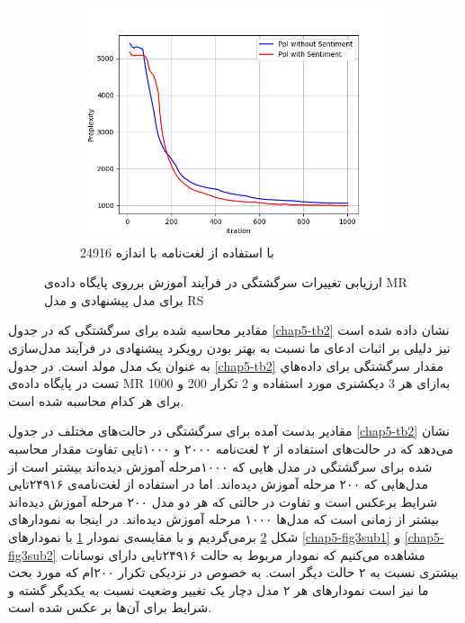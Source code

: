 \begin{figure}[!t]
		\begin{subfigure}{.45\textwidth}
			\includegraphics[scale=.4]{chap5-img/ppl_24916}
			\caption{ با استفاده از  لغت‌نامه با اندازه  24916}
			\label{chap5-fig3sub3}
		\end{subfigure}
	\caption{ارزیابی تغییرات سرگشتگی در فرآیند آموزش برروی پایگاه داده‌ی MR  برای مدل پیشنهادی و مدل RS}
	\label{chap5-fig3}
	\end{figure}

مقادير محاسبه شده برای سرگشتگی که در جدول 
\ref{chap5-tb2}
نشان داده شده است نيز دليلی بر اثبات ادعای ما نسبت به بهتر بودن رويکرد پيشنهادی در فرآیند مدل‌سازی به عنوان یک مدل مولد است. در جدول 
\ref{chap5-tb2}
مقدار سرگشتگی برای داده‌هاي تست در پايگاه داده‌ی 
MR
به‌ازای هر 3 ديکشنری مورد استفاده و 2 تکرار 200 و 1000 برای هر کدام محاسبه شده است.

مقادیر بدست آمده برای سرگشتگی در حالت‌های مختلف در جدول
\ref{chap5-tb2}
نشان می‌‌دهد که در حالت‌های استفاده از ۲ لغت‌نامه ۲۰۰۰ و ۱۰۰۰تایی تفاوت مقدار محاسبه شده برای سرگشتگی در مدل هایی که ۱۰۰۰مرحله آموزش دیده‌اند بیشتر است از مدل‌هایی که ۲۰۰ مرحله آموزش دیده‌اند. اما در استفاده از لغت‌نامه‌ی ۲۴۹۱۶تایی شرایط برعکس است و تفاوت در حالتی که هر دو مدل ۲۰۰ مرحله آموزش دیده‌اند بیشتر از زمانی‌ است که مدل‌ها ۱۰۰۰ مرحله آموزش دیده‌اند. در اینجا به نمودارهای شکل
\ref{chap5-fig3}
برمی‌‌گردیم و با مقایسه‌ی نمودار
\ref{chap5-fig3sub3}
با نمودارهای
 \ref{chap5-fig3sub1}
و
 \ref{chap5-fig3sub2}
مشاهده می‌کنیم که نمودار مربوط به حالت ۲۴۹۱۶تایی دارای نوسانات بیشتری نسبت به ۲ حالت دیگر است. به خصوص در  نزدیکی‌ تکرار ۲۰۰ام که مورد بحث ما نیز است نمودار‌های هر ۲ مدل دچار یک تغییر وضعیت نسبت به یکدیگر گشته و شرایط برای آن‌ها بر عکس شده است.

